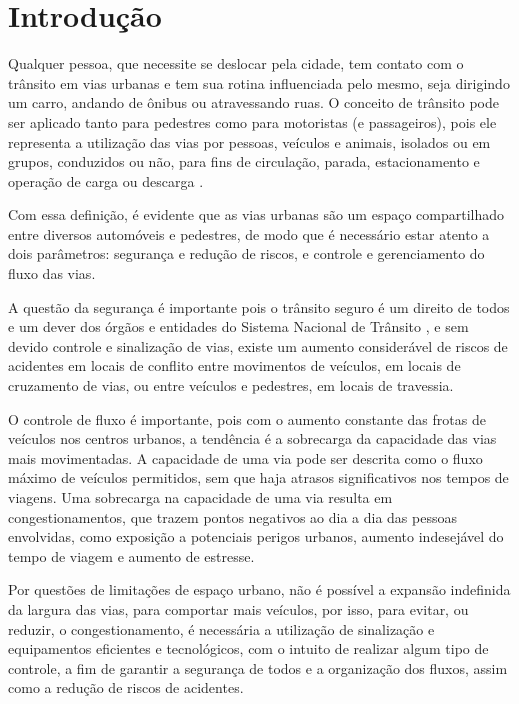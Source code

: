 \chapter{Introdução}

Qualquer pessoa, que necessite se deslocar pela cidade, tem contato com o trânsito em vias urbanas e tem sua rotina influenciada pelo mesmo, seja dirigindo um carro, andando de ônibus ou atravessando ruas. O conceito de trânsito pode ser aplicado tanto para pedestres como para motoristas (e passageiros), pois ele representa a utilização das vias por pessoas, veículos e animais, isolados ou em grupos, conduzidos ou não, para fins de circulação, parada, estacionamento e operação de carga ou descarga \cite{lei}.

Com essa definição, é evidente que as vias urbanas são um espaço compartilhado entre diversos automóveis e pedestres, de modo que é necessário estar atento a dois parâmetros: segurança e redução de riscos, e controle e gerenciamento do fluxo das vias.

A questão da segurança é importante pois o trânsito seguro é um direito de todos e um dever dos órgãos e entidades do Sistema Nacional de Trânsito \cite{manual3}, %
e sem devido controle e sinalização de vias, existe um aumento considerável de riscos de acidentes em locais de conflito entre movimentos de veículos, em locais de cruzamento de vias, ou entre veículos e pedestres, em locais de travessia.

O controle de fluxo é importante, pois com o aumento constante das frotas de veículos nos centros urbanos, a tendência é a sobrecarga da capacidade das vias mais movimentadas. A capacidade de uma via pode ser descrita como o fluxo máximo de veículos permitidos, sem que haja atrasos significativos nos tempos de viagens. Uma sobrecarga na capacidade de uma via resulta em congestionamentos, que trazem pontos negativos ao dia a dia das pessoas envolvidas, como exposição a potenciais perigos urbanos, aumento indesejável do tempo de viagem e aumento de estresse.

Por questões de limitações de espaço urbano, não é possível a expansão indefinida da largura das vias, para comportar mais veículos, por isso, para evitar, ou reduzir, o congestionamento, é necessária a utilização de sinalização e equipamentos eficientes e tecnológicos, com o intuito de realizar algum tipo de controle, a fim de garantir a segurança de todos e a organização dos fluxos, assim como a redução de riscos de acidentes.

